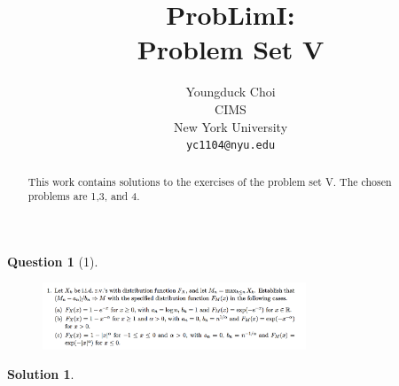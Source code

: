 \documentclass{article} %
\title{ProbLimI: \\
Problem Set V}
\author{
Youngduck Choi \\
CIMS \\
New York University\\
\texttt{yc1104@nyu.edu} \\
}
\theoremstyle{quest}
\newtheorem*{question}{Question}
\newtheorem*{solution}{Solution}
\begin{document}
\maketitle

\begin{abstract}
This work contains solutions to the exercises of the problem set V. The
chosen problems are 1,3, and 4.
\end{abstract}

\bigskip

\begin{question}[1]
\hfill
\begin{figure}[h!]
  \centering
    \includegraphics[width=0.7\textwidth]{prob-e5-p1.png}
\end{figure}
\end{question}
\begin{solution} \hfill \\
\end{solution}

\newpage
\end{document}
